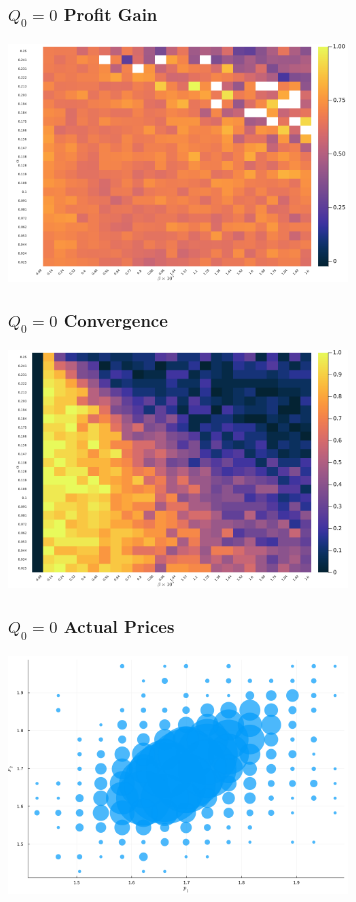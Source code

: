 \documentclass{beamer}
\begin{document}
	\begin{frame}\frametitle{$Q_0=0$ Profit Gain}
\begin{center}
	\includegraphics[width=9cm]{heatmap_profit_gain_small_zero.png}
\end{center}
\end{frame}
\begin{frame}\frametitle{$Q_0=0$ Convergence}
\begin{center}
	\includegraphics[width=9cm]{heatmap_convergence_counts_small_zero.png}
\end{center}
\end{frame}
\begin{frame}\frametitle{$Q_0=0$ Actual Prices}
\begin{center}
	\includegraphics[width=9cm]{scatter_plot_prices_small_zero.png}
\end{center}
\end{frame}
\end{document}
